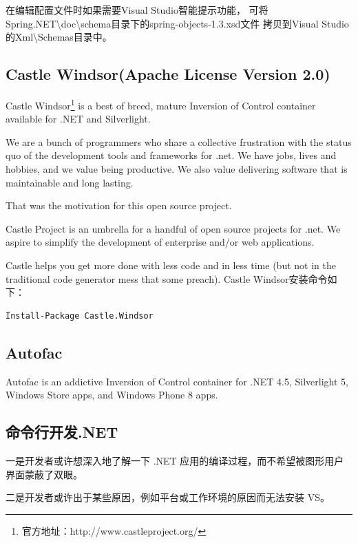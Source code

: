 \documentclass{book}
\newcounter{coderemarks}   %
\newcounter{codevar}     %
\newcommand{\circlemark}[1]{%
\tikz\node[text=white,font=\sffamily\bfseries,inner sep=0.2mm,draw,circle,fill=black]{#1};}
\newcommand{\showremarks}{%
\begin{list}{\circlemark{\arabic{codevar}}} %
{} %
\whiledo{\value{codevar} < \value{coderemarks}}{ %
\item \expandafter\csname codebox\the\value{codevar}\endcsname %
\stepcounter{codevar}} %
\end{list} %
\setcounter{coderemarks}{1}%
\setcounter{codevar}{1}%
}
\begin{document}
\showremarks

在编辑配置文件时如果需要Visual Studio智能提示功能，
可将Spring.NET\textbackslash doc\textbackslash schema目录下的spring-objects-1.3.xsd文件
拷贝到Visual Studio的Xml\textbackslash Schemas目录中。

\subsection{Castle Windsor(Apache License Version 2.0)}

Castle Windsor\footnote{官方地址：http://www.castleproject.org/} is a best of breed, 
mature Inversion of Control container available for .NET and Silverlight.

We are a bunch of programmers who share a collective frustration with 
the status quo of the development tools and frameworks for .net. 
We have jobs, lives and hobbies, and we value being productive. 
We also value delivering software that is maintainable and long lasting.

That was the motivation for this open source project.

Castle Project is an umbrella for a handful of open source projects for .net. 
We aspire to simplify the development of enterprise and/or web applications.

Castle helps you get more done with less code and in less time 
(but not in the traditional code generator mess that some preach).
Castle Windsor安装命令如下：

\begin{lstlisting}[language=Bash]
Install-Package Castle.Windsor
\end{lstlisting}

\subsection{Autofac}

Autofac is an addictive Inversion of Control container for .NET 4.5, 
Silverlight 5, Windows Store apps, and Windows Phone 8 apps.


\subsection{命令行开发.NET}

一是开发者或许想深入地了解一下 .NET 应用的编译过程，而不希望被图形用户界面蒙蔽了双眼。

二是开发者或许出于某些原因，例如平台或工作环境的原因而无法安装 VS。
\end{document}
